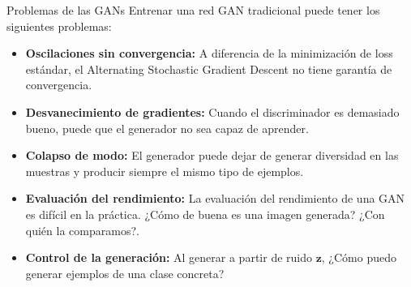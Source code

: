 \documentclass[aspectratio=169]{beamer}
\begin{document}


\begin{frame}[t]{Problemas de las GANs}
	Entrenar una red GAN tradicional puede tener los siguientes problemas:\\
	\begin{itemize}
		\item \textbf{Oscilaciones sin convergencia:} A diferencia de la minimización de loss estándar, el Alternating Stochastic Gradient Descent no tiene garantía de convergencia.
		\item \textbf{Desvanecimiento de gradientes:} Cuando el discriminador es demasiado bueno, puede que el generador no sea capaz de aprender.
		\item \textbf{Colapso de modo:} El generador puede dejar de generar diversidad en las muestras y producir siempre el mismo tipo de ejemplos.
		\item \textbf{Evaluación del rendimiento:} La evaluación del rendimiento de una GAN es difícil en la práctica. ¿Cómo de buena es una imagen generada? ¿Con quién la comparamos?.
		\item \textbf{Control de la generación:} Al generar a partir de ruido $\mathbf{z}$, ¿Cómo puedo generar ejemplos de una clase concreta?

	\end{itemize}
\end{frame}


\end{document}
